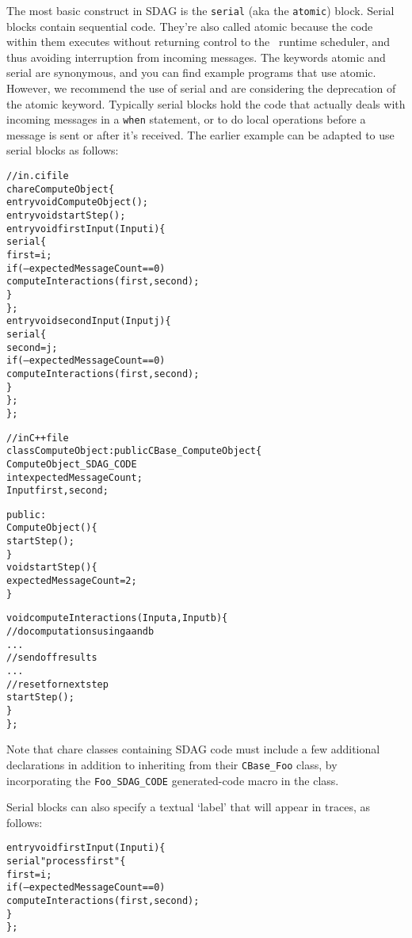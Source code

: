 The most basic construct in SDAG is the {\tt serial} (aka the {\tt atomic}) block.
Serial blocks
contain sequential \CC code.  They're also called atomic because the code within
them executes without returning control to the \charmpp\ runtime scheduler, and
thus avoiding interruption from incoming messages. The keywords atomic and serial
are synonymous, and you can find example programs that use atomic. However, we
recommend the use of serial and are considering the deprecation of the atomic keyword.
Typically serial blocks hold
the code that actually deals with incoming messages in a {\tt when} statement,
or to do local operations before a message is sent or after it's received. The
earlier example can be adapted to use serial blocks as follows:
\begin{center}
\begin{alltt}
// in .ci file
chare ComputeObject \{
  entry void ComputeObject();
  entry void startStep();
  entry void firstInput(Input i) \{
    serial \{
      first = i;
      if (--expectedMessageCount == 0)
        computeInteractions(first, second);
    \}
  \};
  entry void secondInput(Input j) \{
    serial \{
      second = j;
      if (--expectedMessageCount == 0)
        computeInteractions(first, second);
    \}
  \};
\};

// in C++ file
class ComputeObject : public CBase\_ComputeObject \{
  ComputeObject\_SDAG\_CODE
  int   expectedMessageCount;
  Input first, second;

public:
  ComputeObject() \{
    startStep();
  \}
  void startStep() \{
    expectedMessageCount = 2;
  \}

  void computeInteractions(Input a, Input b) \{
    // do computations using a and b
    . . .
    // send off results
    . . .
    // reset for next step
    startStep();
  \}
\};
\end{alltt}
\end{center}
Note that chare classes containing SDAG code must include a few additional declarations
in addition to inheriting from their {\tt CBase\_Foo} class, by incorporating the
{\tt Foo\_SDAG\_CODE} generated-code macro in the class.

Serial blocks can also specify a textual `label' that will appear in traces, as
follows:
\begin{center}
\begin{alltt}
  entry void firstInput(Input i) \{
    serial "process first" \{
      first = i;
      if (--expectedMessageCount == 0)
        computeInteractions(first, second);
    \}
  \};
\end{alltt}
\end{center}

